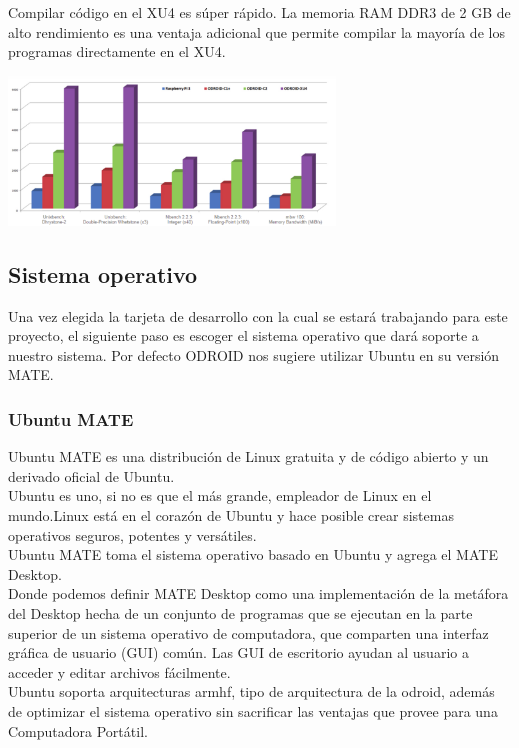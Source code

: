 Compilar código en el XU4 es súper rápido. La memoria RAM DDR3 de 2 GB de
alto rendimiento es una ventaja adicional que permite compilar la mayoría de los
programas directamente en el XU4.~\cite{hardkernel2020}
\begin{center}
    \includegraphics[width=0.65\textwidth]{Capitulo2/Fig6.eps}
    \label{Fig6}
\end{center}

\subsection{Sistema operativo}
Una vez elegida la tarjeta de desarrollo con la cual se estará trabajando para este
proyecto, el siguiente paso es escoger el sistema operativo que dará soporte a nuestro
sistema. Por defecto ODROID nos sugiere utilizar Ubuntu en su versión MATE.
\subsubsection{Ubuntu MATE}
Ubuntu MATE es una distribución de Linux gratuita y de código abierto y un derivado
oficial de Ubuntu.\\
Ubuntu es uno, si no es que el más grande, empleador de Linux en el mundo.Linux está en el
corazón de Ubuntu y hace posible crear sistemas operativos seguros, potentes y versátiles.\\
Ubuntu MATE toma el sistema operativo basado en Ubuntu y agrega el MATE Desktop.\\
Donde podemos definir MATE Desktop como una implementación de la metáfora del Desktop
hecha de un conjunto de programas que se ejecutan en la parte superior de un sistema
operativo de computadora, que comparten una interfaz gráfica de usuario (GUI) común.
Las GUI de escritorio ayudan al usuario a acceder y editar archivos fácilmente.
~\cite{ubuntu2014}\\
Ubuntu soporta arquitecturas armhf, tipo de arquitectura de la odroid, además de optimizar
el sistema operativo sin sacrificar las ventajas que provee para una Computadora Portátil.
